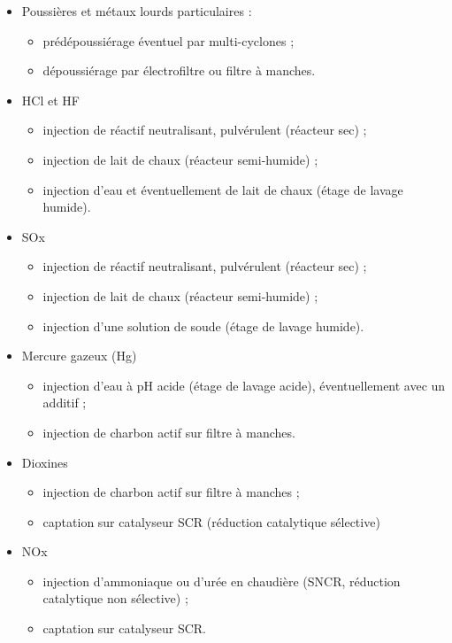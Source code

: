 \begin{itemize}
\item Poussières et métaux lourds particulaires :
    \begin{itemize}
	\item prédépoussiérage éventuel par multi-cyclones ;
	\item dépoussiérage par électrofiltre ou filtre à manches.
    \end{itemize}
\item HCl et HF 
    \begin{itemize}
	\item injection de réactif neutralisant, pulvérulent (réacteur sec) ;
	\item  injection de lait de chaux (réacteur semi-humide) ;
	\item injection d’eau et éventuellement de lait de chaux (étage de lavage humide).

    \end{itemize}
\item SOx
    \begin{itemize}
	\item injection de réactif neutralisant, pulvérulent (réacteur sec) ;
	\item injection de lait de chaux (réacteur semi-humide) ;
	\item  injection d’une solution de soude (étage de lavage humide).

    \end{itemize}
\item Mercure gazeux (Hg)
    \begin{itemize}
	\item  injection d’eau à pH acide (étage de lavage acide), éventuellement avec un additif ;
	\item  injection de charbon actif sur filtre à manches.

    \end{itemize}
\item Dioxines 
\begin{itemize}
	\item  injection de charbon actif sur filtre à manches ;
	\item  captation sur catalyseur SCR (réduction catalytique sélective)

    \end{itemize}
\item NOx
    \begin{itemize}
	\item injection d’ammoniaque ou d’urée en chaudière (SNCR, réduction catalytique non sélective) ;
	\item captation sur catalyseur SCR.

 \end{itemize}
\end{itemize}

